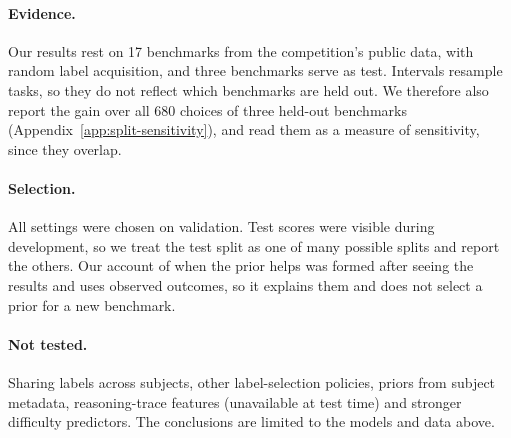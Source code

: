 \label{sec:limitations}
\paragraph{Evidence.} Our results rest on 17 benchmarks from the competition's public data, with random label acquisition, and three benchmarks serve as test. Intervals resample tasks, so they do not reflect which benchmarks are held out. We therefore also report the gain over all 680 choices of three held-out benchmarks (Appendix~\ref{app:split-sensitivity}), and read them as a measure of sensitivity, since they overlap.

\paragraph{Selection.} All settings were chosen on validation. Test scores were visible during development, so we treat the test split as one of many possible splits and report the others. Our account of when the prior helps was formed after seeing the results and uses observed outcomes, so it explains them and does not select a prior for a new benchmark.

\paragraph{Not tested.} Sharing labels across subjects, other label-selection policies, priors from subject metadata, reasoning-trace features (unavailable at test time) and stronger difficulty predictors. The conclusions are limited to the models and data above.

